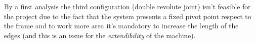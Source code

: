 	By a first analysis the third configuration (double revolute joint) isn't feasible for the project due to the fact that the system presents a fixed pivot point respect to the frame and to work more area it's mandatory to increase the length of the edges (and this is an issue for the \textit{extendibility} of the machine).
	
	
	


	
	
	
	
	
	
	
	
	
	
	
	
	
	
	
	
	
	
	
	
	
	
	
	
	
	
	
	
	
	
	
	
	
	
	
	
	
	
	
	
	
	
	
	
	
	